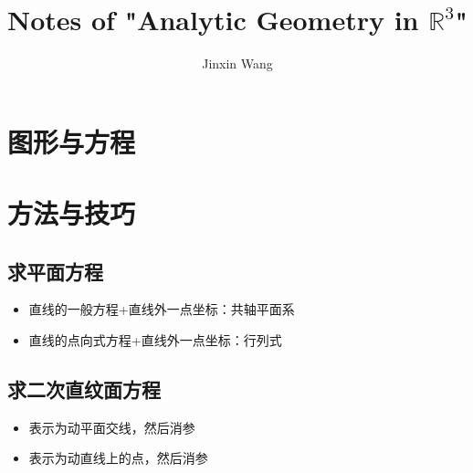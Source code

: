 \documentclass[onecolumn]{ctexart}
\title{Notes of "Analytic Geometry in $\mathbb{R}^3$"}
\author{Jinxin Wang}
\date{}
\begin{document}
\maketitle

\section{图形与方程}

\section{方法与技巧}

\subsection{求平面方程}
\begin{itemize}
  \item 直线的一般方程+直线外一点坐标：共轴平面系
  \item 直线的点向式方程+直线外一点坐标：行列式
\end{itemize}

\subsection{求二次直纹面方程}
\begin{itemize}
  \item 表示为动平面交线，然后消参
  \item 表示为动直线上的点，然后消参
\end{itemize}
\end{document}

